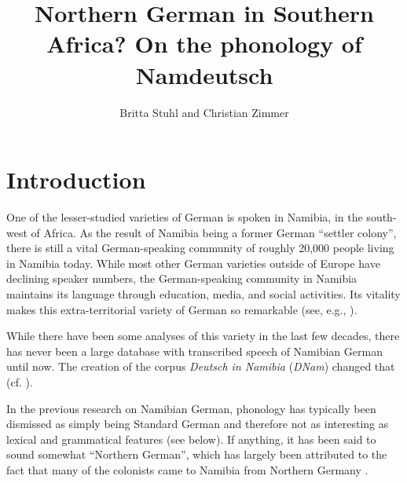 \documentclass[output=paper]{langsci/langscibook}
\author{Britta Stuhl\affiliation{Freie Universität Berlin} and Christian Zimmer\affiliation{Freie Universität Berlin}}
\title[Northern German in Southern Africa?]{Northern German in Southern Africa? On the phonology of Namdeutsch}
\begin{document}
\maketitle 


\section{Introduction}
\label{sec:stuhl:1}

One of the lesser-studied varieties of German is spoken in Namibia, in the south-west of Africa. As the result of Namibia being a former German “settler colony”, there is still a vital German-speaking community of roughly 20,000 people living in Namibia today. While most other German varieties outside of Europe have declining speaker numbers, the German-speaking community in Namibia maintains its language through education, media, and social activities. Its vitality makes this extra-territorial variety of German so remarkable (see, e.g., \citealt{wiese_german_2017}).

While there have been some analyses of this variety in the last few decades, there has never been a large database with transcribed speech of Namibian German until now. The creation of the corpus \textit{Deutsch in Namibia} (\textit{DNam}) changed that (cf. \citealt{zimmer_korpus_2020}). 

In the previous research on Namibian German, phonology has typically been dismissed as simply being Standard German and therefore not as interesting as lexical and grammatical features (see below). If anything, it has been said to sound somewhat “Northern German”, which has largely been attributed to the fact that many of the colonists came to Namibia from Northern Germany \citep[564]{bohm_deutsch_2003}. 
\end{document}
